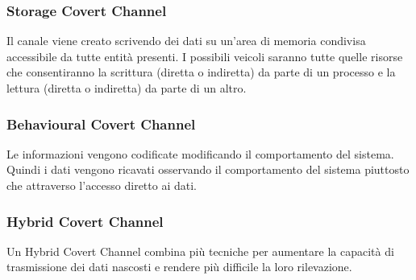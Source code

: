 \subsubsection{Storage Covert Channel}
Il canale viene creato scrivendo dei dati su un'area di memoria condivisa accessibile da tutte entità presenti. 
I possibili veicoli saranno tutte quelle risorse che consentiranno la scrittura (diretta o indiretta) da parte di un processo e 
la lettura (diretta o indiretta) da parte di un altro.  

\subsubsection{Behavioural Covert Channel}  
Le informazioni vengono codificate modificando il comportamento del sistema. 
Quindi i dati vengono ricavati osservando il comportamento del sistema  
piuttosto che attraverso l'accesso diretto ai dati. 

\subsubsection{Hybrid Covert Channel} 
Un Hybrid Covert Channel combina più tecniche per aumentare la capacità di trasmissione dei 
dati nascosti e rendere più difficile la loro rilevazione. 

